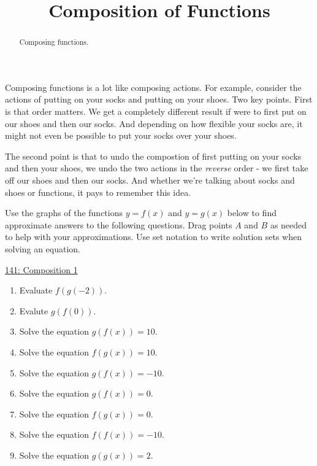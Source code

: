 \documentclass{ximera}
\title{Composition of Functions}
\begin{document}
\begin{abstract}
Composing functions.
\end{abstract}
\maketitle


Composing functions is a lot like composing actions. For example, consider the actions of putting on your socks and putting on your shoes. Two key points. First is that order matters. We get a completely different result if were to first put on our shoes and then our socks. And depending on how flexible your socks are, it might not even be possible to put your socks over your shoes.

The second point is that to undo the compostion of first putting on your socks and then your shoes, we undo the two actions in the \emph{reverse} order - we first take off our shoes and then our socks. And whether we're talking about socks and shoes or functions, it pays to remember this idea.

\begin{example}  \label{Erer54r56t364}
Use the graphs of the functions $y=f(x)$ and $y=g(x)$ below to find approximate answers to the following questions. Drag points $A$ and $B$ as needed to help with your approximations. Use set notation to write solution sets when solving an equation.

\begin{onlineOnly}
    \begin{center}
\end{center}
\end{onlineOnly}

\href{https://www.desmos.com/calculator/zxb4adsbjb}{141: Composition 1}

\begin{enumerate}

\item Evaluate $f(g(-2))$.

\item Evalute $g(f(0))$.

\item Solve the equation $g(f(x))=10$.

\item Solve the equation $f(g(x)) = 10$.

\item Solve the equation $g(f(x)) = -10$.

\item Solve the equation $g(f(x)) = 0$.

\item Solve the equation $f(g(x)) = 0$.

\item Solve the equation $f(f(x)) = -10$.

\item Solve the equation $g(g(x)) = 2$.

\end{enumerate}

\end{example}
\end{document}
